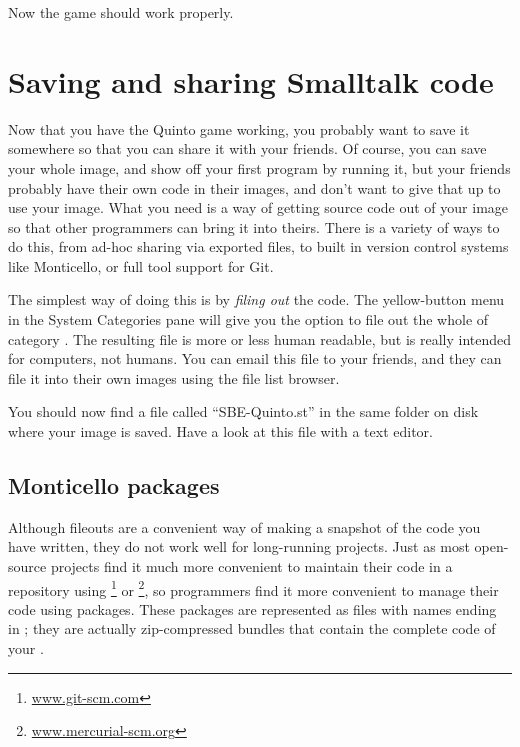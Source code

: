\documentclass[a4paper,10pt,twoside]{book}
\begin{document}
Now the game should work properly.

\section{Saving and sharing Smalltalk code}
\label{sec:Monticello}

Now that you have the Quinto game working, you probably want to save it somewhere so that you can share it with your friends. Of course, you can save your whole \squeak image, and show off your first program by running it, but your friends probably have their own code in their images, and don't want to give that up to use your image.
What you need is a way of getting source code out of your \squeak image so that other programmers can bring it into theirs. There is a variety of ways to do this, from ad-hoc sharing via exported files, to built in version control systems like Monticello, or full tool support for Git.

The simplest way of doing this is by \emph{filing out} the code.  The yellow-button menu in the System Categories pane will give you the option to file out the whole of category .
The resulting file is more or less human readable, but is really intended for computers, not humans.
You can email this file to your friends, and they can file it into their own \squeak images using the file list browser.

You should now find a file called ``SBE-Quinto.st'' in the same folder on disk where your image is saved.
Have a look at this file with a text editor.


\subsection{Monticello packages}
Although fileouts are a convenient way of making a snapshot of the code you have written, they do not work well for long-running projects.
Just as most open-source projects find it much more convenient to maintain their code in a repository using \footnote{\url{www.git-scm.com}} or \footnote{\url{www.mercurial-scm.org}},
so \squeak programmers find it more convenient to manage their code using  packages. 
These packages are represented as files with names ending in ; they are actually zip-compressed bundles that contain the complete code of your .
\end{document}
